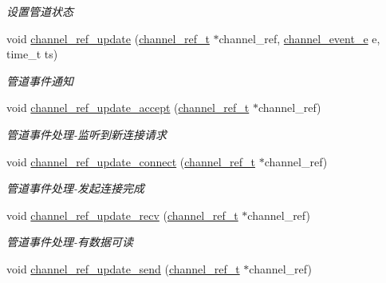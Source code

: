 \begin{DoxyCompactItemize}
\begin{DoxyCompactList}\small\item\em 设置管道状态 \end{DoxyCompactList}\item 
void \hyperlink{a00045_aac9295d2423894326c8b62e0ee851f89_aac9295d2423894326c8b62e0ee851f89}{channel\+\_\+ref\+\_\+update} (\hyperlink{a00047_a151271c9d188ef28d4d24bb81dcc1263_a151271c9d188ef28d4d24bb81dcc1263}{channel\+\_\+ref\+\_\+t} $\ast$channel\+\_\+ref, \hyperlink{a00047_a5ad43ab162fdf9ad53cde10ed3d87d99_a5ad43ab162fdf9ad53cde10ed3d87d99}{channel\+\_\+event\+\_\+e} e, time\+\_\+t ts)
\begin{DoxyCompactList}\small\item\em 管道事件通知 \end{DoxyCompactList}\item 
void \hyperlink{a00045_a31545bffe4e0837eaf754465732642c4_a31545bffe4e0837eaf754465732642c4}{channel\+\_\+ref\+\_\+update\+\_\+accept} (\hyperlink{a00047_a151271c9d188ef28d4d24bb81dcc1263_a151271c9d188ef28d4d24bb81dcc1263}{channel\+\_\+ref\+\_\+t} $\ast$channel\+\_\+ref)
\begin{DoxyCompactList}\small\item\em 管道事件处理-\/监听到新连接请求 \end{DoxyCompactList}\item 
void \hyperlink{a00045_ac3dee255a82a9d1fb1fc3c63a2905a5a_ac3dee255a82a9d1fb1fc3c63a2905a5a}{channel\+\_\+ref\+\_\+update\+\_\+connect} (\hyperlink{a00047_a151271c9d188ef28d4d24bb81dcc1263_a151271c9d188ef28d4d24bb81dcc1263}{channel\+\_\+ref\+\_\+t} $\ast$channel\+\_\+ref)
\begin{DoxyCompactList}\small\item\em 管道事件处理-\/发起连接完成 \end{DoxyCompactList}\item 
void \hyperlink{a00045_a1c47df1906826a2a5b6d99fbc51918d1_a1c47df1906826a2a5b6d99fbc51918d1}{channel\+\_\+ref\+\_\+update\+\_\+recv} (\hyperlink{a00047_a151271c9d188ef28d4d24bb81dcc1263_a151271c9d188ef28d4d24bb81dcc1263}{channel\+\_\+ref\+\_\+t} $\ast$channel\+\_\+ref)
\begin{DoxyCompactList}\small\item\em 管道事件处理-\/有数据可读 \end{DoxyCompactList}\item 
void \hyperlink{a00045_ae7b781b5faec09b7bd383e4e59dfb40f_ae7b781b5faec09b7bd383e4e59dfb40f}{channel\+\_\+ref\+\_\+update\+\_\+send} (\hyperlink{a00047_a151271c9d188ef28d4d24bb81dcc1263_a151271c9d188ef28d4d24bb81dcc1263}{channel\+\_\+ref\+\_\+t} $\ast$channel\+\_\+ref)

\end{DoxyCompactItemize}
